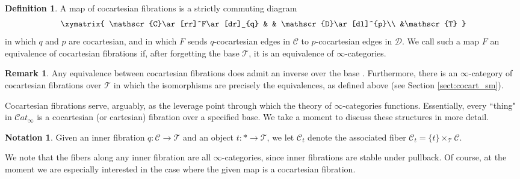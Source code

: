\documentclass[reqno]{amsart}
\theoremstyle{definition}
\newtheorem{definition}[lemma]{Definition}
\newtheorem{remark}[lemma]{Remark}
\newtheorem{notation}[lemma]{Notation}
\newcommand{\msc}[1]{\mathscr{#1}}
\renewcommand{\1}{\mathbf{1}}
\begin{document}
\begin{definition}
A map of cocartesian fibrations is a strictly commuting diagram
\[
\xymatrix{
\msc{C}\ar[rr]^F\ar[dr]_{q} & & \msc{D}\ar[dl]^{p}\\
	&\msc{T}
}
\]
in which $q$ and $p$ are cocartesian, and in which $F$ sends $q$-cocartesian edges in $\msc{C}$ to $p$-cocartesian edges in $\msc{D}$.  We call such a map $F$ an equivalence of cocartesian fibrations if, after forgetting the base $\msc{T}$, it is an equivalence of $\infty$-categories.
\end{definition}

\begin{remark}
Any equivalence between cocartesian fibrations does admit an inverse over the base \cite[\href{https://kerodon.net/tag/0285}{0285}, \href{https://kerodon.net/tag/028B}{028B}]{kerodon}. Furthermore, there is an $\infty$-category of cocartesian fibrations over $\msc{T}$ in which the isomorphisms are precisely the equivalences, as defined above (see Section \ref{sect:cocart_sm}).
\end{remark}

Cocartesian fibrations serve, arguably, as the leverage point through which the theory of $\infty$-categories functions.  Essentially, every ``thing" in $\msc{C}\!at_{\infty}$ is a cocartesian (or cartesian) fibration over a specified base.  We take a moment to discuss these structures in more detail.

\begin{notation}
Given an inner fibration $q:\msc{C}\to \msc{T}$ and an object $t:\ast\to \msc{T}$, we let $\msc{C}_t$ denote the associated fiber $\msc{C}_t=\{t\}\times_{\msc{T}}\msc{C}$.
\end{notation}

We note that the fibers along any inner fibration are all $\infty$-categories, since inner fibrations are stable under pullback. Of course, at the moment we are especially interested in the case where the given map is a cocartesian fibration.
\end{document}
